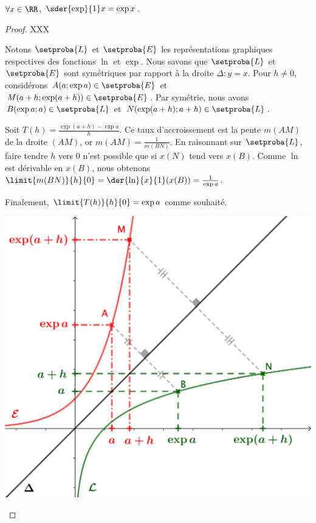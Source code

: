 \begin{fact}
	$\forall x \in \RR$,
	$\sder{\exp}{1} x = \exp x$.
\end{fact}


\begin{proof}
	XXX
	
	Notons $\setproba{L}$ et $\setproba{E}$ les représentations graphiques respectives des fonctions $\ln$ et $\exp$.
	Nous savons que $\setproba{L}$ et $\setproba{E}$ sont symétriques par rapport à la droite $\Delta: y = x$.
	Pour $h \neq 0$, considérons 
	$A(a ; \exp a) \in \setproba{E}$ et $M(a+h ; \exp(a+h)) \in \setproba{E}$.
	Par symétrie, nous avons
	$B(\exp a ; a) \in \setproba{L}$ et $N(\exp(a+h) ; a+h) \in \setproba{L}$.
	
	Soit $T(h) = \frac{\exp(a+h) - \exp a}{h}$.
	Ce taux d'accroissement est la pente $m(AM)$ de la droite $(AM)$,
	or $m(AM) = \frac{1}{m(BN)}$.
	En raisonnant sur $\setproba{L}$, faire tendre $h$ vers $0$ n'est possible que si $x(N)$ tend vers $x(B)$.
	Comme $\ln$ est dérivable en $x(B)$, nous obtenons $\limit{m(BN)}{h}{0} = \der{\ln}{x}{1}(x(B)) = \frac{1}{\exp a}$.
	

	Finalement,
	$\limit{T(h)}{h}{0} = \exp a$
	comme souhaité.

	\begin{center}
		\includegraphics[scale=.85]{content/exp/eq-diff.png}
	\end{center}
	
	\null
	\vspace{-6.5ex}
\end{proof}